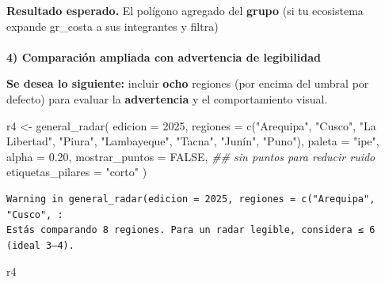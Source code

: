 \documentclass[
  11pt,
  letterpaper,
  DIV=11,
  numbers=noendperiod]{scrartcl}
\makeatletter
\let\oldparagraph\paragraph
\renewcommand{\paragraph}{
    \@ifstar
      \xxxParagraphStar
      \xxxParagraphNoStar
  }
\newcommand{\xxxParagraphStar}[1]{\oldparagraph*{#1}\mbox{}}
\newcommand{\xxxParagraphNoStar}[1]{\oldparagraph{#1}\mbox{}}
\newenvironment{Shaded}{\begin{snugshade}}{\end{snugshade}}
\newcommand{\AttributeTok}[1]{\textcolor[rgb]{0.40,0.45,0.13}{#1}}
\newcommand{\ConstantTok}[1]{\textcolor[rgb]{0.56,0.35,0.01}{#1}}
\newcommand{\DecValTok}[1]{\textcolor[rgb]{0.68,0.00,0.00}{#1}}
\newcommand{\DocumentationTok}[1]{\textcolor[rgb]{0.37,0.37,0.37}{\textit{#1}}}
\newcommand{\FloatTok}[1]{\textcolor[rgb]{0.68,0.00,0.00}{#1}}
\newcommand{\FunctionTok}[1]{\textcolor[rgb]{0.28,0.35,0.67}{#1}}
\newcommand{\NormalTok}[1]{\textcolor[rgb]{0.00,0.23,0.31}{#1}}
\newcommand{\OtherTok}[1]{\textcolor[rgb]{0.00,0.23,0.31}{#1}}
\newcommand{\StringTok}[1]{\textcolor[rgb]{0.13,0.47,0.30}{#1}}
\makeatother
\begin{document}
\textbf{Resultado esperado.} El polígono agregado del \textbf{grupo} (si
tu ecosistema expande gr\_costa a sus integrantes y filtra)

\paragraph{\texorpdfstring{\textbf{4) Comparación ampliada con
advertencia de
legibilidad}}{4) Comparación ampliada con advertencia de legibilidad}}\label{comparaciuxf3n-ampliada-con-advertencia-de-legibilidad}

\textbf{Se desea lo siguiente:} incluir \textbf{ocho} regiones (por
encima del umbral por defecto) para evaluar la \textbf{advertencia} y el
comportamiento visual.

\begin{Shaded}
\begin{Highlighting}[]
\NormalTok{r4 }\OtherTok{\textless{}{-}} \FunctionTok{general\_radar}\NormalTok{(}
  \AttributeTok{edicion  =} \DecValTok{2025}\NormalTok{,}
  \AttributeTok{regiones =} \FunctionTok{c}\NormalTok{(}\StringTok{"Arequipa"}\NormalTok{, }\StringTok{"Cusco"}\NormalTok{, }\StringTok{"La Libertad"}\NormalTok{,}
               \StringTok{"Piura"}\NormalTok{, }\StringTok{"Lambayeque"}\NormalTok{, }\StringTok{"Tacna"}\NormalTok{,}
               \StringTok{"Junín"}\NormalTok{, }\StringTok{"Puno"}\NormalTok{),}
  \AttributeTok{paleta   =} \StringTok{"ipe"}\NormalTok{,}
  \AttributeTok{alpha    =} \FloatTok{0.20}\NormalTok{,}
  \AttributeTok{mostrar\_puntos    =} \ConstantTok{FALSE}\NormalTok{,   }\DocumentationTok{\#\# sin puntos para reducir ruido}
  \AttributeTok{etiquetas\_pilares =} \StringTok{"corto"}     
\NormalTok{)}
\end{Highlighting}
\end{Shaded}

\begin{verbatim}
Warning in general_radar(edicion = 2025, regiones = c("Arequipa", "Cusco", :
Estás comparando 8 regiones. Para un radar legible, considera ≤ 6 (ideal 3–4).
\end{verbatim}

\begin{Shaded}
\begin{Highlighting}[]
\NormalTok{r4}
\end{Highlighting}
\end{Shaded}
\end{document}
